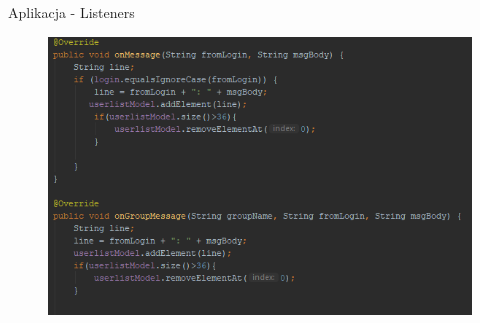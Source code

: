 \documentclass{beamer}
\begin{document}
\begin{frame}{Aplikacja - Listeners}

\begin{figure}
\centering
  \begin{minipage}[b]{0.3\textwidth}
\end{minipage}
  \hfill
  \begin{minipage}[b]{0.65\textwidth}
\includegraphics[width=\textwidth,right]{listener_msg}
 \end{minipage}
\end{figure}
\end{frame}
\end{document}
